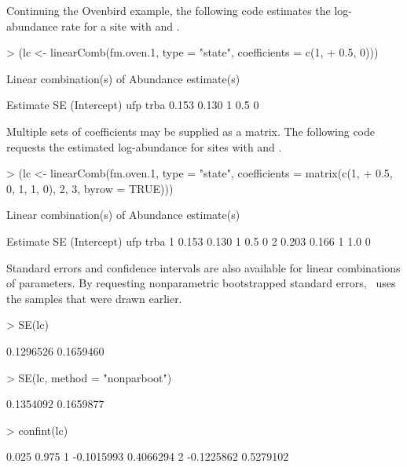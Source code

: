 \documentclass[article,shortnames]{jss}
\newcommand{\um}{\pkg{unmarked}}
\begin{document}
Continuing the Ovenbird example, the following code estimates the
log-abundance rate for a site with  and .

\begin{Schunk}
\begin{Sinput}
> (lc <- linearComb(fm.oven.1, type = "state", coefficients = c(1, 
+     0.5, 0)))
\end{Sinput}
\begin{Soutput}
Linear combination(s) of Abundance estimate(s)

 Estimate    SE (Intercept) ufp trba
    0.153 0.130           1 0.5    0
\end{Soutput}
\end{Schunk}

Multiple sets of coefficients may be supplied as a matrix.  The
following code requests the estimated log-abundance for sites with
 and . 

\begin{Schunk}
\begin{Sinput}
> (lc <- linearComb(fm.oven.1, type = "state", coefficients = matrix(c(1, 
+     0.5, 0, 1, 1, 0), 2, 3, byrow = TRUE)))
\end{Sinput}
\begin{Soutput}
Linear combination(s) of Abundance estimate(s)

  Estimate    SE (Intercept) ufp trba
1    0.153 0.130           1 0.5    0
2    0.203 0.166           1 1.0    0
\end{Soutput}
\end{Schunk}

Standard errors and confidence intervals are also available for linear
combinations of parameters.  By requesting nonparametric bootstrapped
standard errors, \um\ uses the samples that were drawn earlier.

\begin{Schunk}
\begin{Sinput}
> SE(lc)
\end{Sinput}
\begin{Soutput}
[1] 0.1296526 0.1659460
\end{Soutput}
\begin{Sinput}
> SE(lc, method = "nonparboot")
\end{Sinput}
\begin{Soutput}
[1] 0.1354092 0.1659877
\end{Soutput}
\begin{Sinput}
> confint(lc)
\end{Sinput}
\begin{Soutput}
       0.025     0.975
1 -0.1015993 0.4066294
2 -0.1225862 0.5279102
\end{Soutput}
\end{Schunk}
\end{document}
